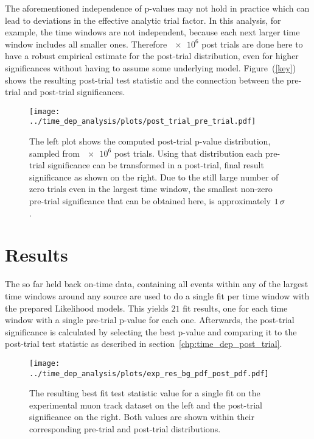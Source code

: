 The aforementioned independence of p-values may not hold in practice which can lead to deviations in the effective analytic trial factor.
In this analysis, for example, the time windows are not independent, because each next larger time window includes all smaller ones.
Therefore $\num{e6}$ post trials are done here to have a robust empirical estimate for the post-trial distribution, even for higher significances without having to assume some underlying model.
Figure~(\ref{key}) shows the resulting post-trial test statistic and the connection between the pre-trial and post-trial significances.

\begin{figure}[htbp]
  \centering
  \texttt{[image: ../time\_dep\_analysis/plots/post\_trial\_pre\_trial.pdf]}
  \caption[Connection between pre-trial and post-trial significances]{
    The left plot shows the computed post-trial p-value distribution, sampled from $\num{e6}$ post trials.
    Using that distribution each pre-trial significance can be transformed in a post-trial, final result significance as shown on the right.
    Due to the still large number of zero trials even in the largest time window, the smallest non-zero pre-trial significance that can be obtained here, is approximately $\num{1}\,\sigma$.
  }
  \label{fig:post_trial_pre_trial}
\end{figure}


\section{Results}
The so far held back on-time data, containing all events within any of the largest time windows around any source are used to do a single fit per time window with the prepared Likelihood models.
This yields $\num{21}$ fit results, one for each time window with a single pre-trial p-value for each one.
Afterwards, the post-trial significance is calculated by selecting the best p-value and comparing it to the post-trial test statistic as described in section~\ref{chp:time_dep_post_trial}.

\begin{figure}[htbp]
  \centering
  \texttt{[image: ../time\_dep\_analysis/plots/exp\_res\_bg\_pdf\_post\_pdf.pdf]}
  \caption[Experimental result for the time-dependent analysis]{
    The resulting best fit test statistic value for a single fit on the experimental muon track dataset on the left and the post-trial significance on the right.
    Both values are shown within their corresponding pre-trial and post-trial distributions.
  }
  \label{fig:tdep_exp_res_bg_pdf_post_pdf}
\end{figure}

